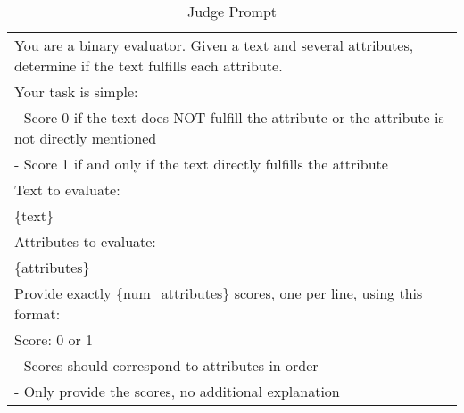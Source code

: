 \begin{table}[htbp]
    \centering
    \small
    \begin{tabular}{p{7cm}}
     \toprule
You are a binary evaluator. Given a text and several attributes, determine if the text fulfills each attribute. \\

Your task is simple: \\
- Score 0 if the text does NOT fulfill the attribute or the attribute is not directly mentioned \\
- Score 1 if and only if the text directly fulfills the attribute \\

Text to evaluate: \\
\{text\} \\

Attributes to evaluate: \\
\{attributes\} \\

Provide exactly \{num\_attributes\} scores, one per line, using this format: \\
Score: 0 or 1 \\

- Scores should correspond to attributes in order \\
- Only provide the scores, no additional explanation \\
\bottomrule
    \end{tabular}
    \caption{Judge Prompt}
    \label{tab:judge_prompt}
\end{table}